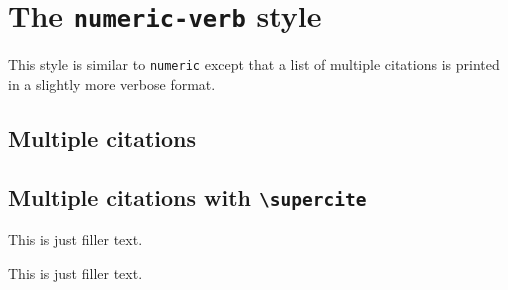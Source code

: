 \documentclass[a4paper]{article}
\newcommand{\cmd}[1]{\texttt{\textbackslash #1}}
\begin{document}
\section*{The \texttt{numeric-verb} style}

This style is similar to \texttt{numeric} except that a list of
multiple citations is printed in a slightly more verbose format.

\subsection*{Multiple citations}

\cite{hammond,massa,augustine,cotton,set,murray,bertram,stdmodel}

\cite{set:yoon,stdmodel:salam,set:herrmann}

\subsection*{Multiple citations with \cmd{supercite}}

This is just filler text.\supercite{hammond,massa,augustine,cotton,set,murray,bertram,stdmodel}

This is just filler text.\supercite{set:yoon,stdmodel:salam,set:herrmann}

\clearpage
\printbibliography
\end{document}
